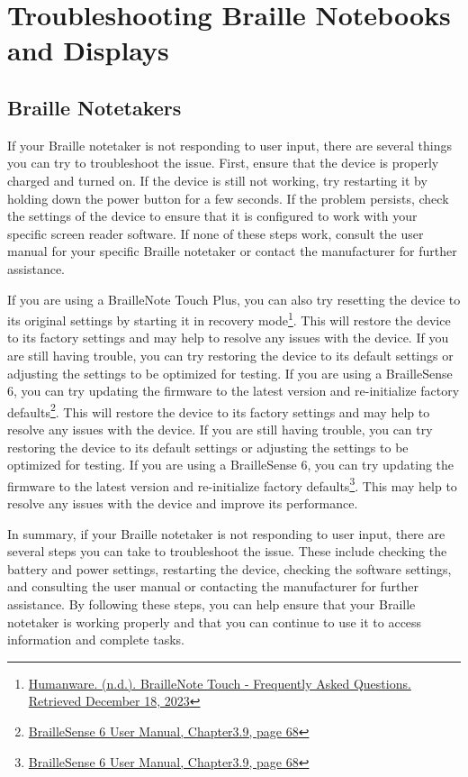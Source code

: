 \chapter{Troubleshooting Braille Notebooks and Displays}\label{trouble2}
\section{Braille Notetakers}\label{notebook}
If your Braille notetaker is not responding to user input, there are several things you can try to troubleshoot the issue. First, ensure that the device is properly charged and turned on. If the device is still not working, try restarting it by holding down the power button for a few seconds. If the problem persists, check the settings of the device to ensure that it is configured to work with your specific screen reader software. If none of these steps work, consult the user manual for your specific Braille notetaker or contact the manufacturer for further assistance.

If you are using a BrailleNote Touch Plus, you can also try resetting the device to its original settings by starting it in recovery mode\footnote{\raggedright \href{http://www.humanware.com/microsite/bntouch/faq.php}{Humanware. (n.d.). BrailleNote Touch - Frequently Asked Questions. Retrieved December 18, 2023}}. This will restore the device to its factory settings and may help to resolve any issues with the device. If you are still having trouble, you can try restoring the device to its default settings or adjusting the settings to be optimized for testing. If you are using a BrailleSense 6, you can try updating the firmware to the latest version and re-initialize factory defaults\footnote{\raggedright \href{http://hims-inc.com/wp-content/uploads/2023/11/BrailleSense-6-User-Manual-V2-1.pdf}{BrailleSense 6 User Manual, Chapter3.9, page 68}}. This will restore the device to its factory settings and may help to resolve any issues with the device. If you are still having trouble, you can try restoring the device to its default settings or adjusting the settings to be optimized for testing. If you are using a BrailleSense 6, you can try updating the firmware to the latest version and re-initialize factory defaults\footnote{\raggedright \href{http://hims-inc.com/wp-content/uploads/2023/11/BrailleSense-6-User-Manual-V2-1.pdf}{BrailleSense 6 User Manual, Chapter3.9, page 68}}. This may help to resolve any issues with the device and improve its performance.

In summary, if your Braille notetaker is not responding to user input, there are several steps you can take to troubleshoot the issue. These include checking the battery and power settings, restarting the device, checking the software settings, and consulting the user manual or contacting the manufacturer for further assistance. By following these steps, you can help ensure that your Braille notetaker is working properly and that you can continue to use it to access information and complete tasks.
